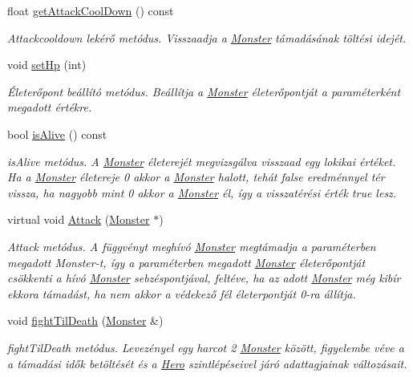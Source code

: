 \begin{DoxyCompactItemize}
float \hyperlink{classMonster_abcb5bbbf0cd0ff5c599438511a63a6ae}{get\+Attack\+Cool\+Down} () const
\begin{DoxyCompactList}\small\item\em Attackcooldown lekérő metódus. Visszaadja a \hyperlink{classMonster}{Monster} támadásának töltési idejét. \end{DoxyCompactList}\item 
void \hyperlink{classMonster_a6d3e2bbbde9ffa2992323f4ed810a8ab}{set\+Hp} (int)
\begin{DoxyCompactList}\small\item\em Életerőpont beállító metódus. Beállítja a \hyperlink{classMonster}{Monster} életerőpontját a paraméterként megadott értékre. \end{DoxyCompactList}\item 
\mbox{\label{classMonster_a77ad18c44b3fb2df92b30ece4dc7847b}} 
bool \hyperlink{classMonster_a77ad18c44b3fb2df92b30ece4dc7847b}{is\+Alive} () const
\begin{DoxyCompactList}\small\item\em is\+Alive metódus. A \hyperlink{classMonster}{Monster} életerejét megvizsgálva visszaad egy lokikai értéket. Ha a \hyperlink{classMonster}{Monster} életereje 0 akkor a \hyperlink{classMonster}{Monster} halott, tehát false eredménnyel tér vissza, ha nagyobb mint 0 akkor a \hyperlink{classMonster}{Monster} él, így a visszatérési érték true lesz. \end{DoxyCompactList}\item 
virtual void \hyperlink{classMonster_a8de70695e71755873f1f3cc0c78ef549}{Attack} (\hyperlink{classMonster}{Monster} $\ast$)
\begin{DoxyCompactList}\small\item\em Attack metódus. A függvényt meghívó \hyperlink{classMonster}{Monster} megtámadja a paraméterben megadott Monster-\/t, így a paraméterben megadott \hyperlink{classMonster}{Monster} életerőpontját csökkenti a hívó \hyperlink{classMonster}{Monster} sebzéspontjával, feltéve, ha az adott \hyperlink{classMonster}{Monster} még kibír ekkora támadást, ha nem akkor a védekező fél életerpontját 0-\/ra állítja. \end{DoxyCompactList}\item 
void \hyperlink{classMonster_aa47d4844baa751a937a2d85ea7dfb54f}{fight\+Til\+Death} (\hyperlink{classMonster}{Monster} \&)
\begin{DoxyCompactList}\small\item\em fight\+Til\+Death metódus. Levezényel egy harcot 2 \hyperlink{classMonster}{Monster} között, figyelembe véve a a támadási idők betöltését és a \hyperlink{classHero}{Hero} szintlépéseivel járó adattagjainak változásait. \end{DoxyCompactList}\item 

\end{DoxyCompactItemize}
